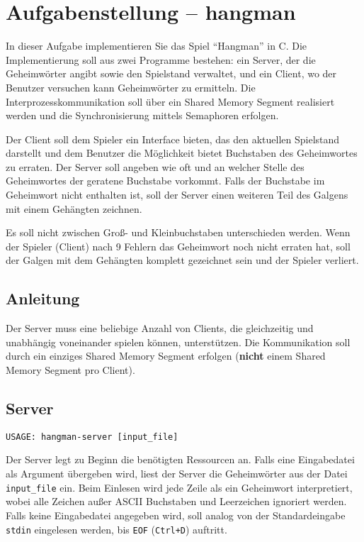 



\section*{Aufgabenstellung -- hangman}


In dieser Aufgabe implementieren Sie das Spiel "`Hangman"' in C. Die
Implementierung soll aus zwei Programme bestehen: ein Server, der die
Geheimwörter angibt sowie den Spielstand verwaltet, und ein Client, wo der
Benutzer versuchen kann Geheimwörter zu ermitteln.  Die
Interprozesskommunikation soll über ein Shared Memory Segment realisiert werden
und die Synchronisierung mittels Semaphoren erfolgen.


Der Client soll dem Spieler ein Interface bieten, das den aktuellen Spielstand
darstellt und dem Benutzer die Möglichkeit bietet Buchstaben des Geheimwortes
zu erraten.  Der Server soll angeben wie oft und an welcher Stelle des
Geheimwortes der geratene Buchstabe vorkommt. Falls der Buchstabe im Geheimwort
nicht enthalten ist, soll der Server einen weiteren Teil des Galgens mit einem
Gehängten zeichnen.

Es soll nicht zwischen Groß- und Kleinbuchstaben unterschieden werden. Wenn der
Spieler (Client) nach 9 Fehlern das Geheimwort noch nicht erraten hat, soll der
Galgen mit dem Gehängten komplett gezeichnet sein und der Spieler verliert.

\subsection*{Anleitung} Der Server muss eine beliebige Anzahl von Clients, die
gleichzeitig und unabhängig voneinander spielen können, unterstützen. Die
Kommunikation soll durch ein einziges Shared Memory Segment erfolgen
(\textbf{nicht} einem Shared Memory Segment pro Client).


\subsection*{Server}

\begin{verbatim}
USAGE: hangman-server [input_file]
\end{verbatim}

Der Server legt zu Beginn die benötigten Ressourcen an. Falls eine Eingabedatei
als Argument übergeben wird, liest der Server die Geheimwörter aus der Datei
\verb|input_file| ein. Beim Einlesen wird jede Zeile als ein Geheimwort
interpretiert, wobei alle Zeichen außer ASCII Buchstaben und Leerzeichen
ignoriert werden. Falls keine Eingabedatei angegeben wird, soll analog von der
Standardeingabe \verb|stdin| eingelesen werden, bis \verb|EOF| (\verb|Ctrl+D|)
auftritt.

